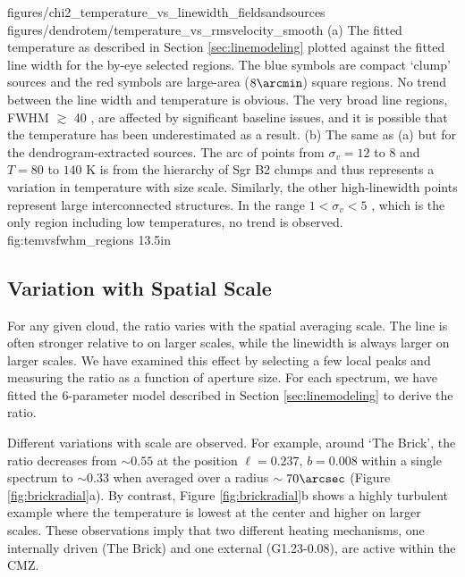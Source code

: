 \FigureTwo
{figures/chi2_temperature_vs_linewidth_fieldsandsources}
{figures/dendrotem/temperature_vs_rmsvelocity_smooth} %
{(a) 
The fitted temperature as described in Section \ref{sec:linemodeling} plotted
against the fitted line width for the by-eye selected regions.  The blue
symbols are compact `clump' sources and the red symbols are large-area
($8\arcmin$) square regions.  No trend between the line width and temperature
is obvious.  The very broad line regions, FWHM $\gtrsim$ 40 \kms, are affected
by significant baseline issues, and it is possible that the temperature has been
underestimated as a result.
(b) The same as (a) but for the dendrogram-extracted sources.  The arc of points
from $\sigma_v=12$ to $8$ \kms and $T=80$ to $140$ K is from the hierarchy of
Sgr B2 clumps and thus represents a variation in temperature with size scale.
Similarly, the other high-linewidth points represent large interconnected
structures.  In the range $1 < \sigma_v < 5$ \kms, which is the only region
including low temperatures, no trend is observed.}
{fig:temvsfwhm_regions}
{1}{3.5in}



\subsection{Variation with Spatial Scale}
For any given cloud, the ratio \Rone varies with the spatial averaging scale.
The \para \threeohthree line is often stronger relative to \threetwoone on
larger scales, while the linewidth is always larger on larger scales.  We have
examined this effect by selecting a few local \para \threeohthree peaks and
measuring the ratio \Rone as a function of aperture size.  For each spectrum,
we have fitted the 6-parameter model described in Section
\ref{sec:linemodeling} to derive the ratio.

Different variations with scale are observed.  For example, around `The Brick',
the ratio decreases from $\sim0.55$ at the position $\ell=0.237$, $b=0.008$
within a single spectrum to $\sim0.33$ when averaged over a radius
$\sim70\arcsec$ (Figure \ref{fig:brickradial}a).  By contrast, Figure
\ref{fig:brickradial}b shows a highly turbulent example where the temperature
is lowest at the center and higher on larger scales.  These observations imply
that two different heating mechanisms, one internally driven (The Brick) and
one external (G1.23-0.08), are active within the CMZ.

